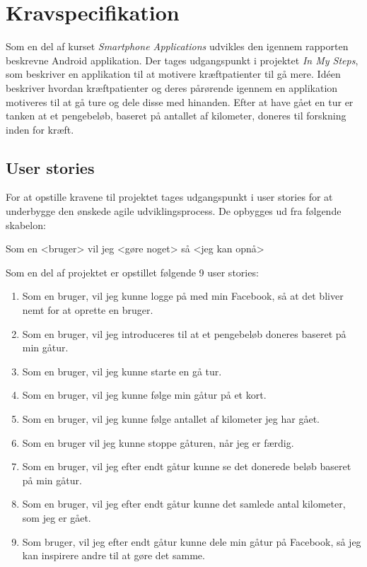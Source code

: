 \thispagestyle{fancy}
\chapter{Kravspecifikation}
\label{chp:description}
Som en del af kurset \emph{Smartphone Applications} udvikles den igennem rapporten beskrevne Android applikation. Der tages udgangspunkt i projektet \emph{In My Steps}, som beskriver en applikation til at motivere kræftpatienter til gå mere. Idéen beskriver hvordan kræftpatienter og deres pårørende igennem en applikation motiveres til at gå ture og dele disse med hinanden. Efter at have gået en tur er tanken at et pengebeløb, baseret på antallet af kilometer, doneres til forskning inden for kræft.

\section{User stories}
For at opstille kravene til projektet tages udgangspunkt i user stories for at underbygge den ønskede agile udviklingsprocess.
De opbygges ud fra følgende skabelon: \\

\centerline{Som en <bruger> vil jeg <gøre noget> så <jeg kan opnå>}  \hfill

Som en del af projektet er opstillet følgende 9 user stories:
\begin{enumerate}

\item Som en bruger, vil jeg kunne logge på med min Facebook, så at det bliver nemt for at oprette en bruger. 
\item Som en bruger, vil jeg introduceres til at et pengebeløb doneres baseret på min gåtur. 
\item Som en bruger, vil jeg kunne starte en gå tur.
\item Som en bruger, vil jeg kunne følge min gåtur på et kort. 
\item Som en bruger, vil jeg kunne følge antallet af kilometer jeg har gået. 
\item Som en bruger vil jeg kunne stoppe gåturen, når jeg er færdig. 
\item Som en bruger, vil jeg efter endt gåtur kunne se det donerede beløb baseret på min gåtur. 
\item Som en bruger, vil jeg efter endt gåtur kunne det samlede antal kilometer, som jeg er gået. 
\item Som bruger, vil jeg efter endt gåtur kunne dele min gåtur på Facebook, så jeg kan inspirere andre til at gøre det samme. 
\end{enumerate}